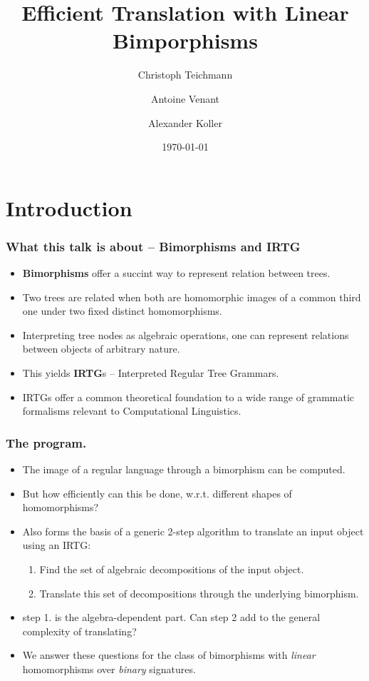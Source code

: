 \documentclass{beamer}
\begin{document}
\title{Efficient Translation with Linear Bimporphisms} 
\author[Antoine Venant]{Christoph Teichmann \and Antoine Venant \and Alexander Koller}
\date{\today}
\maketitle


\section{Introduction}

\begin{frame}
  \frametitle{What this talk is about -- Bimorphisms and IRTG}
  \begin{itemize}
  \item \textbf{Bimorphisms} offer a succint way to represent relation between trees.
  \item Two trees are related when both are homomorphic images of a common third one under two fixed distinct homomorphisms.
  \item Interpreting tree nodes as algebraic operations, one can represent relations between objects of arbitrary nature.
  \item This yields \textbf{IRTG}s -- Interpreted Regular Tree Grammars.
  \item IRTGs offer a common theoretical foundation to a wide range of grammatic formalisms relevant to Computational Linguistics.
  \end{itemize}
\end{frame}

\begin{frame}
  \frametitle{The program.}
  \begin{itemize}
  \item The image of a regular language through a bimorphism can be computed.
  \item \alert{But how efficiently can this be done, w.r.t. different shapes of homomorphisms?}
  \item Also forms the basis of a generic 2-step algorithm to translate an input object using an IRTG:
    \begin{enumerate}
    \item Find the set of algebraic decompositions of the input object.
    \item Translate this set of decompositions through the underlying bimorphism.
    \end{enumerate}
  \item \alert{step 1. is the algebra-dependent part. Can step 2 add to the general complexity of translating?}
  \item We answer these questions for the class of bimorphisms with \emph{linear} homomorphisms over \emph{binary} signatures.
  \end{itemize}
\end{frame}
\end{document}
